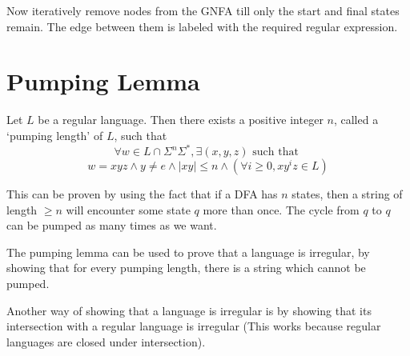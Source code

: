 Now iteratively remove nodes from the GNFA till only the start and final states remain.
The edge between them is labeled with the required regular expression.

\section{Pumping Lemma}

\begin{theorem}
Let $L$ be a regular language.
Then there exists a positive integer $n$, called a `pumping length' of $L$, such that
\[ \forall w \in L \cap \Sigma^n\Sigma^*,
\exists (x, y, z) \textrm{ such that } \]
\[ w = xyz \wedge y \neq e \wedge |xy| \le n \wedge
(\forall i \ge 0, xy^iz \in L) \]
\end{theorem}

This can be proven by using the fact that if a DFA has $n$ states,
then a string of length $\ge n$ will encounter some state $q$ more than once.
The cycle from $q$ to $q$ can be pumped as many times as we want.

The pumping lemma can be used to prove that a language is irregular,
by showing that for every pumping length, there is a string which cannot be pumped.

Another way of showing that a language is irregular is by showing that its
intersection with a regular language is irregular
(This works because regular languages are closed under intersection).



